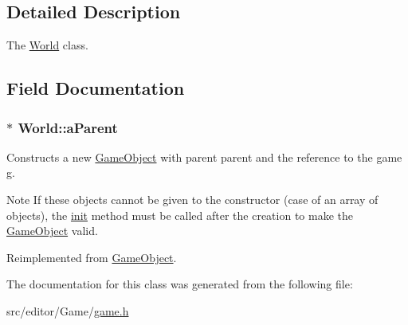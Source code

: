 \subsection{\-Detailed \-Description}
\-The \hyperlink{class_world}{\-World} class. 

\subsection{\-Field \-Documentation}
\hypertarget{class_world_af24924a1b6c6596b1c0a293651ffccaf}{
\subsubsection[{a\-Parent}]{$\ast$ {\bf \-World\-::a\-Parent}}}\label{class_world_af24924a1b6c6596b1c0a293651ffccaf}
\-Constructs a new \hyperlink{class_game_object}{\-Game\-Object} with parent {\ttfamily parent} and the reference to the game {\ttfamily g}.

\begin{DoxyNote}{\-Note}
\-If these objects cannot be given to the constructor (case of an array of objects), the \hyperlink{class_game_object_a97be7b59b2e76e7d60de2146b894eed9}{init} method must be called after the creation to make the \hyperlink{class_game_object}{\-Game\-Object} valid. 
\end{DoxyNote}


\-Reimplemented from \hyperlink{class_game_object_a41d4afe43f955e78ede0bbd4ad8957f8}{\-Game\-Object}.



\-The documentation for this class was generated from the following file\-:\begin{DoxyCompactItemize}
\item 
src/editor/\-Game/\hyperlink{game_8h}{game.\-h}\end{DoxyCompactItemize}
